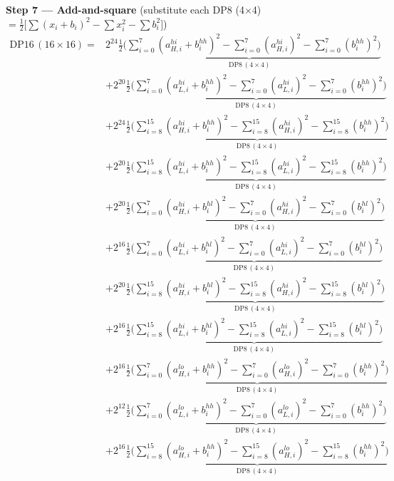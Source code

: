 \documentclass[fleqn]{article}
\newcommand{\DPop}[3]{\mathrm{DP#1}\,(#2\!\times\!#3)}
\begin{document}
\textbf{Step 7 --- Add-and-square}\quad
{\small(substitute each DP8 (4$\times$4) $= \tfrac{1}{2}\big[\sum(x_i{+}b_i)^2 - \sum x_i^2 - \sum b_i^2\big]$)}
\begin{align*}
\DPop{16}{16}{16} = {}
  & 2^{24}\underbrace{\tfrac{1}{2}\Big(\sum_{i=0}^{7}(a_{H,i}^{hi}{+}b_i^{hh})^2 - \sum_{i=0}^{7}(a_{H,i}^{hi})^2 - \sum_{i=0}^{7}(b_i^{hh})^2\Big)}_{\DPop{8}{4}{4}} \\[0.3em]
  & + 2^{20}\underbrace{\tfrac{1}{2}\Big(\sum_{i=0}^{7}(a_{L,i}^{hi}{+}b_i^{hh})^2 - \sum_{i=0}^{7}(a_{L,i}^{hi})^2 - \sum_{i=0}^{7}(b_i^{hh})^2\Big)}_{\DPop{8}{4}{4}} \\[0.3em]
  & + 2^{24}\underbrace{\tfrac{1}{2}\Big(\sum_{i=8}^{15}(a_{H,i}^{hi}{+}b_i^{hh})^2 - \sum_{i=8}^{15}(a_{H,i}^{hi})^2 - \sum_{i=8}^{15}(b_i^{hh})^2\Big)}_{\DPop{8}{4}{4}} \\[0.3em]
  & + 2^{20}\underbrace{\tfrac{1}{2}\Big(\sum_{i=8}^{15}(a_{L,i}^{hi}{+}b_i^{hh})^2 - \sum_{i=8}^{15}(a_{L,i}^{hi})^2 - \sum_{i=8}^{15}(b_i^{hh})^2\Big)}_{\DPop{8}{4}{4}} \\[0.3em]
  & + 2^{20}\underbrace{\tfrac{1}{2}\Big(\sum_{i=0}^{7}(a_{H,i}^{hi}{+}b_i^{hl})^2 - \sum_{i=0}^{7}(a_{H,i}^{hi})^2 - \sum_{i=0}^{7}(b_i^{hl})^2\Big)}_{\DPop{8}{4}{4}} \\[0.3em]
  & + 2^{16}\underbrace{\tfrac{1}{2}\Big(\sum_{i=0}^{7}(a_{L,i}^{hi}{+}b_i^{hl})^2 - \sum_{i=0}^{7}(a_{L,i}^{hi})^2 - \sum_{i=0}^{7}(b_i^{hl})^2\Big)}_{\DPop{8}{4}{4}} \\[0.3em]
  & + 2^{20}\underbrace{\tfrac{1}{2}\Big(\sum_{i=8}^{15}(a_{H,i}^{hi}{+}b_i^{hl})^2 - \sum_{i=8}^{15}(a_{H,i}^{hi})^2 - \sum_{i=8}^{15}(b_i^{hl})^2\Big)}_{\DPop{8}{4}{4}} \\[0.3em]
  & + 2^{16}\underbrace{\tfrac{1}{2}\Big(\sum_{i=8}^{15}(a_{L,i}^{hi}{+}b_i^{hl})^2 - \sum_{i=8}^{15}(a_{L,i}^{hi})^2 - \sum_{i=8}^{15}(b_i^{hl})^2\Big)}_{\DPop{8}{4}{4}} \\[0.3em]
  & + 2^{16}\underbrace{\tfrac{1}{2}\Big(\sum_{i=0}^{7}(a_{H,i}^{lo}{+}b_i^{hh})^2 - \sum_{i=0}^{7}(a_{H,i}^{lo})^2 - \sum_{i=0}^{7}(b_i^{hh})^2\Big)}_{\DPop{8}{4}{4}} \\[0.3em]
  & + 2^{12}\underbrace{\tfrac{1}{2}\Big(\sum_{i=0}^{7}(a_{L,i}^{lo}{+}b_i^{hh})^2 - \sum_{i=0}^{7}(a_{L,i}^{lo})^2 - \sum_{i=0}^{7}(b_i^{hh})^2\Big)}_{\DPop{8}{4}{4}} \\[0.3em]
  & + 2^{16}\underbrace{\tfrac{1}{2}\Big(\sum_{i=8}^{15}(a_{H,i}^{lo}{+}b_i^{hh})^2 - \sum_{i=8}^{15}(a_{H,i}^{lo})^2 - \sum_{i=8}^{15}(b_i^{hh})^2\Big)}_{\DPop{8}{4}{4}} \\[0.3em]

\end{align*}
\end{document}

